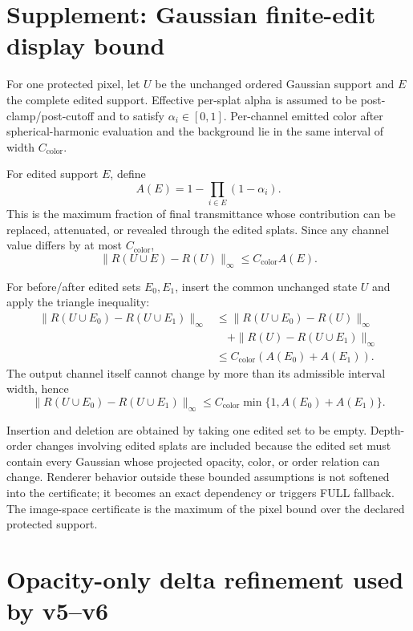 
\section*{Supplement: Gaussian finite-edit display bound}

For one protected pixel, let $U$ be the unchanged ordered Gaussian support and
$E$ the complete edited support. Effective per-splat alpha is assumed to be
post-clamp/post-cutoff and to satisfy $\alpha_i\in[0,1]$. Per-channel emitted
color after spherical-harmonic evaluation and the background lie in the same
interval of width
$C_{\mathrm{color}}$.

For edited support $E$, define
\[
A(E)=1-\prod_{i\in E}(1-\alpha_i).
\]
This is the maximum fraction of final transmittance whose contribution can be
replaced, attenuated, or revealed through the edited splats. Since any channel
value differs by at most $C_{\mathrm{color}}$,
\[
\|R(U\cup E)-R(U)\|_\infty \le C_{\mathrm{color}}A(E).
\]

For before/after edited sets $E_0,E_1$, insert the common unchanged state $U$
and apply the triangle inequality:
\[
\begin{aligned}
\|R(U\cup E_0)-R(U\cup E_1)\|_\infty
&\le \|R(U\cup E_0)-R(U)\|_\infty\\
&\quad+\|R(U)-R(U\cup E_1)\|_\infty\\
&\le C_{\mathrm{color}}\left(A(E_0)+A(E_1)\right).
\end{aligned}
\]
The output channel itself cannot change by more than its admissible interval
width, hence
\[
\|R(U\cup E_0)-R(U\cup E_1)\|_\infty
\le C_{\mathrm{color}}\min\{1,A(E_0)+A(E_1)\}.
\]

Insertion and deletion are obtained by taking one edited set to be empty.
Depth-order changes involving edited splats are included because the edited set
must contain every Gaussian whose projected opacity, color, or order relation
can change. Renderer behavior outside these bounded assumptions is not softened
into the certificate; it becomes an exact dependency or triggers FULL fallback.
The image-space certificate is the maximum of the pixel bound over the declared
protected support.


\section*{Opacity-only delta refinement used by v5--v6}

